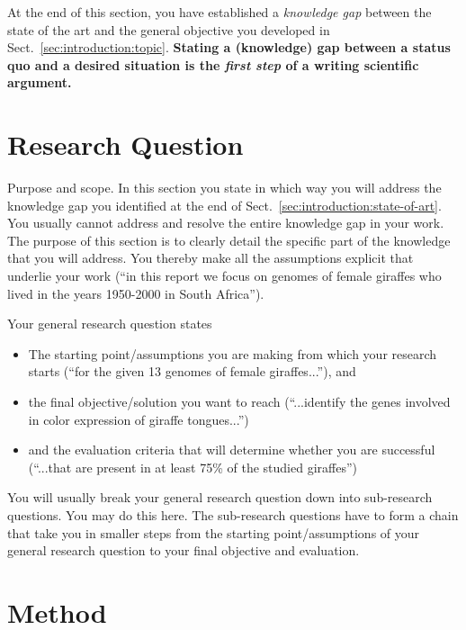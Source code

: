 \documentclass[12pt,a4paper,footinclude=true,twoside,headinclude=true]{report}
\begin{document}
At the end of this section, you have established a \emph{knowledge gap} between the state of the art and the general objective you developed in Sect.~\ref{sec:introduction:topic}. \textbf{Stating a (knowledge) gap between a status quo and a desired situation is the \emph{first step} of a writing scientific argument.} 


\section{Research Question}\label{sec:introduction:research-question}

\textsf{Purpose and scope}. In this section you state in which way you will address the knowledge gap you identified at the end of Sect.~\ref{sec:introduction:state-of-art}. You usually cannot address and resolve the entire knowledge gap in your work. The purpose of this section is to clearly detail the specific part of the knowledge that you will address. You thereby make all the assumptions explicit that underlie your work (``in this report we focus on genomes of female giraffes who lived in the years 1950-2000 in South Africa'').

Your general research question states
\begin{itemize}
    \item The starting point/assumptions you are making from which your research starts (``for the given 13 genomes of female giraffes...''), and
    \item the final objective/solution you want to reach (``...identify the genes involved in color expression of giraffe tongues...'')
    \item and the evaluation criteria that will determine whether you are successful (``...that are present in at least 75\% of the studied giraffes'')
\end{itemize}

You will usually break your general research question down into sub-research questions. You may do this here. The sub-research questions have to form a chain that take you in smaller steps from the starting point/assumptions of your general research question to your final objective and evaluation.

\section{Method}\label{sec:introduction:method}
 
\end{document}
